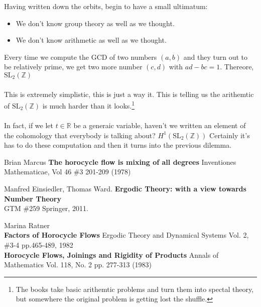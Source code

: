 \documentclass[12pt]{article}
\begin{document}
Having written down the orbits, begin to have a small ultimatum:
\begin{itemize}
\item We don't know group theory as well as we thought.
\item We don't know arithmetic as well as we thought.
\end{itemize}
Every time we compute the GCD of two numbers $(a,b)$ and they turn out to be relatively prime, we get two more number $(c,d)$ with $ad-bc=1$.  Thereore, $\text{SL}_2(\mathbb{Z})$  \\ \\
This is extremely simplistic, this is just a way it.  This is telling us the arithemtic of $\text{SL}_2(\mathbb{Z})$ is much harder than it looks.\footnote{The books take basic arithemtic problems and turn them into spectal theory, but somewhere the original problem is getting lost the shuffle.} \\ \\  In fact, if we let $t \in \mathbb{R}$ be a generaic variable, haven't we written an element of the cohomology that everybody is talking about?  $H^1(\text{SL}_2(\mathbb{Z}))$ Certainly it's has to do these computation and then it turns into the previous dilemma. 
\vfill
\begin{thebibliography}{} 

\item Brian Marcus \textbf{The horocycle flow is mixing of all degrees} Inventiones Mathematicae, Vol 46 \#3 201-209 (1978)

\item Manfred Einsiedler, Thomas Ward. \textbf{Ergodic Theory: with a view towards Number Theory} \\GTM \#259 Springer, 2011.

\item Marina Ratner \\ 
\textbf{Factors of Horocycle Flows}  Ergodic Theory and Dynamical Systems  Vol. 2, \#3-4 pp.465-489, 1982 \\
\textbf{Horocycle Flows, Joinings and Rigidity of Products} Annals of Mathematics Vol. 118, No. 2 pp. 277-313 (1983)

\end{thebibliography}
\end{document}
